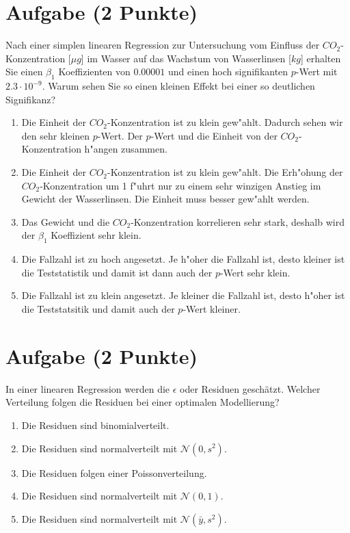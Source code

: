 \documentclass[a4paper, 9pt]{scrartcl}\usepackage[]{graphicx}\usepackage[]{xcolor}
\begin{document}
\section{Aufgabe \hfill (2 Punkte)}

Nach einer simplen linearen Regression zur Untersuchung vom Einfluss der
$CO_2$-Konzentration [$\mu g$] im Wasser auf das Wachstum von Wasserlinsen
[$kg$] erhalten Sie einen $\beta_1$ Koeffizienten von $0.00001$ und einen
hoch signifikanten $p$-Wert mit $2.3\cdot 10^{-9}$. Warum sehen Sie so einen kleinen
Effekt bei einer so deutlichen Signifikanz? 




\begin{enumerate}
\item [\textbf{A} \msquare] Die Einheit der $CO_2$-Konzentration ist zu klein gew{"a}hlt. Dadurch sehen wir den sehr kleinen $p$-Wert. Der $p$-Wert und die Einheit von der $CO_2$-Konzentration h{"a}ngen zusammen.
\item [\textbf{B} \msquare] Die Einheit der $CO_2$-Konzentration ist zu klein gew{"a}hlt. Die Erh{"o}hung der $CO_2$-Konzentration um 1 f{"u}hrt nur zu einem sehr winzigen Anstieg im Gewicht der Wasserlinsen. Die Einheit muss besser gew{"a}hlt werden.
\item [\textbf{C} \msquare] Das Gewicht und die $CO_2$-Konzentration korrelieren sehr stark, deshalb wird der $\beta_1$ Koeffizient sehr klein.
\item [\textbf{D} \msquare] Die Fallzahl ist zu hoch angesetzt. Je h{"o}her die Fallzahl ist, desto kleiner ist die Teststatistik und damit ist dann auch der $p$-Wert sehr klein.
\item [\textbf{E} \msquare] Die Fallzahl ist zu klein angesetzt. Je kleiner die Fallzahl ist, desto h{"o}her ist die Teststatsitik und damit auch der $p$-Wert kleiner. 
\end{enumerate}

\section{Aufgabe \hfill (2 Punkte)}

In einer linearen Regression werden die $\epsilon$ oder Residuen
gesch{\"a}tzt. Welcher Verteilung folgen die Residuen bei einer optimalen
Modellierung? 



\begin{enumerate}
\item [\textbf{A} \msquare] Die Residuen sind binomialverteilt.
\item [\textbf{B} \msquare] Die Residuen sind normalverteilt mit $\mathcal{N}(0, s^2)$.
\item [\textbf{C} \msquare] Die Residuen folgen einer Poissonverteilung.
\item [\textbf{D} \msquare] Die Residuen sind normalverteilt mit $\mathcal{N}(0, 1)$.
\item [\textbf{E} \msquare] Die Residuen sind normalverteilt mit $\mathcal{N}(\bar{y}, s^2)$.
\end{enumerate}
\end{document}
